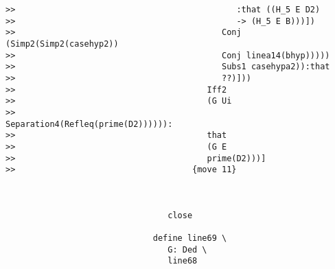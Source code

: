 \documentclass[12pt]{article}
\begin{document}
\begin{verbatim}
>>                                             :that ((H_5 E D2)
>>                                             -> (H_5 E B)))])
>>                                          Conj (Simp2(Simp2(casehyp2))
>>                                          Conj linea14(bhyp)))))
>>                                          Subs1 casehypa2)):that
>>                                          ??)]))
>>                                       Iff2
>>                                       (G Ui
>>                                       Separation4(Refleq(prime(D2)))))):
>>                                       that
>>                                       (G E
>>                                       prime(D2)))]
>>                                    {move 11}



                                 close

                              define line69 \
                                 G: Ded \
                                 line68


\end{verbatim}
\end{document}
